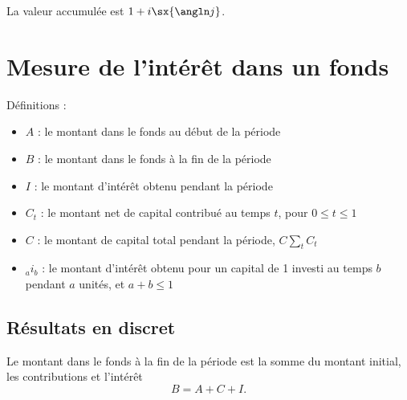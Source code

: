 \begin{center}
\end{center}

La valeur accumulée est $1 + i\sx{\angln j}$.

\section{Mesure de l'intérêt dans un fonds}

Définitions : 

\begin{itemize}
	\item $A$ : le montant dans le fonds au début de la période
	\item $B$ : le montant dans le fonds à la fin de la période
	\item $I$ : le montant d'intérêt obtenu pendant la période
	\item $C_t$ : le montant net de capital contribué au temps $t$, pour $0\leq t\leq 1$
	\item $C$ : le montant de capital total pendant la période, $C \sum_t C_t$
	\item ${}_ai_b$ : le montant d'intérêt obtenu pour un capital de 1 investi au temps $b$ pendant $a$ unités, et $a + b \leq 1$
\end{itemize}

\subsection{Résultats en discret}

Le montant dans le fonds à la fin de la période est la somme du montant initial, les contributions et l'intérêt
$$B = A + C + I.$$

